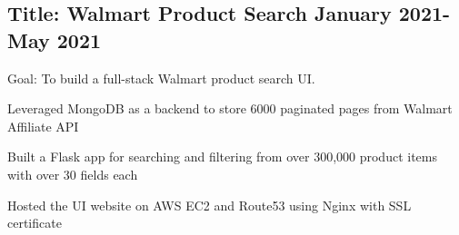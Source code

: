 \documentclass[11pt]{article}
\begin{document}
\subsection*{Title: Walmart Product Search \hfill {\normalfont January 2021-May 2021}}
\noindent
\href{https://github.com/Anthonyive/DSCI-551-Project.git}{} Goal: To build a full-stack Walmart product search UI.
\begin{compactitem}
    \item Leveraged MongoDB as a backend to store 6000 paginated pages from Walmart
    Affiliate API
    \item Built a Flask app for searching and filtering from over 300,000
    product items with over 30 fields each
    \item Hosted the UI website on AWS EC2 and Route53 using Nginx with SSL
    certificate
\end{compactitem}
\vspace{0.1in}


\end{document}
